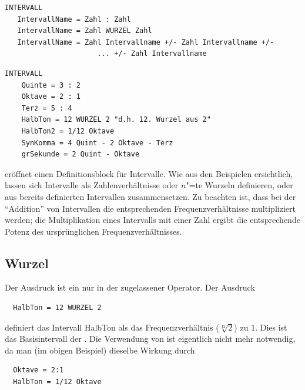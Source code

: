 
\begin{verbatim}
INTERVALL
   IntervallName = Zahl : Zahl
   IntervallName = Zahl WURZEL Zahl
   IntervallName = Zahl Intervallname +/- Zahl Intervallname +/- 
                      ... +/- Zahl Intervallname
\end{verbatim}



\begin{verbatim}
INTERVALL
    Quinte = 3 : 2 
    Oktave = 2 : 1 
    Terz = 5 : 4 
    HalbTon = 12 WURZEL 2 "d.h. 12. Wurzel aus 2" 
    HalbTon2 = 1/12 Oktave 
    SynKomma = 4 Quint - 2 Oktave - Terz 
    grSekunde = 2 Quint - Oktave
\end{verbatim}




 eröffnet einen Definitionsblock für Intervalle.  Wie aus den
Beispielen ersichtlich, lassen sich Intervalle als Zahlenverhältnisse
oder $n$"=te Wurzeln definieren, oder aus bereits definierten
Intervallen zusammensetzen. Zu beachten ist, dass bei der "`Addition"'
von Intervallen die entsprechenden Frequenzverhältnisse multipliziert
werden; die Multiplikation eines Intervalls mit einer Zahl ergibt die
entsprechende Potenz des ursprünglichen Frequenzverhältnisses.


\subsection{ Wurzel}
\label{sec:SX_ROOT}



Der Ausdruck  ist ein nur in der
 zugelassener
Operator. Der Ausdruck

\begin{verbatim}
  HalbTon = 12 WURZEL 2 
\end{verbatim}


definiert das Intervall HalbTon als das Frequenzverhältnis 
($\sqrt[12]{2}$) zu 1. Dies ist das Basisintervall der . Die Verwendung von  ist eigentlich nicht 
mehr notwendig, da man (im obigen Beispiel) dieselbe Wirkung 
durch

\begin{verbatim}
  Oktave = 2:1 
  HalbTon = 1/12 Oktave 
\end{verbatim}


